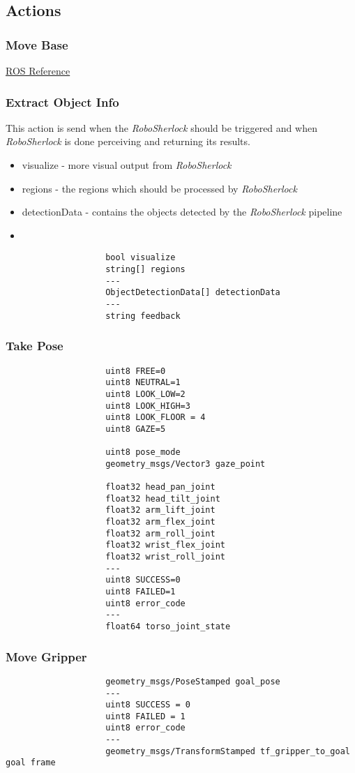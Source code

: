 \documentclass[main.tex]{subfiles}
\begin{document}
				\subsection{Actions}
				\label{actions}
					\subsubsection{Move Base}
						\href{http://wiki.ros.org/move_base_msgs/MoveBaseAction}{ROS Reference}
					\subsubsection{Extract Object Info}
						This action is send when the \textit{RoboSherlock} should be triggered and when \textit{RoboSherlock} is done perceiving and returning its results.
					\begin{itemize}
						\item visualize - more visual output from \textit{RoboSherlock}
						\item regions - the regions which should be processed by \textit{RoboSherlock}
						\item detectionData - contains the objects detected by the \textit{RoboSherlock} pipeline
						\item
					\end{itemize}
					\begin{lstlisting}
					bool visualize
					string[] regions
					---
					ObjectDetectionData[] detectionData
					---
					string feedback
					\end{lstlisting}
					\subsubsection{Take Pose}
					\begin{lstlisting}
					uint8 FREE=0
					uint8 NEUTRAL=1
					uint8 LOOK_LOW=2
					uint8 LOOK_HIGH=3
					uint8 LOOK_FLOOR = 4
					uint8 GAZE=5
		
					uint8 pose_mode
					geometry_msgs/Vector3 gaze_point
		
					float32 head_pan_joint
					float32 head_tilt_joint
					float32 arm_lift_joint
					float32 arm_flex_joint
					float32 arm_roll_joint
					float32 wrist_flex_joint
					float32 wrist_roll_joint
					---
					uint8 SUCCESS=0
					uint8 FAILED=1
					uint8 error_code
					---
					float64 torso_joint_state
					\end{lstlisting}
				\subsubsection{Move Gripper}
					\begin{lstlisting}
					geometry_msgs/PoseStamped goal_pose
					---
					uint8 SUCCESS = 0
					uint8 FAILED = 1
					uint8 error_code
					---
					geometry_msgs/TransformStamped tf_gripper_to_goal goal frame
					\end{lstlisting}
\end{document}
